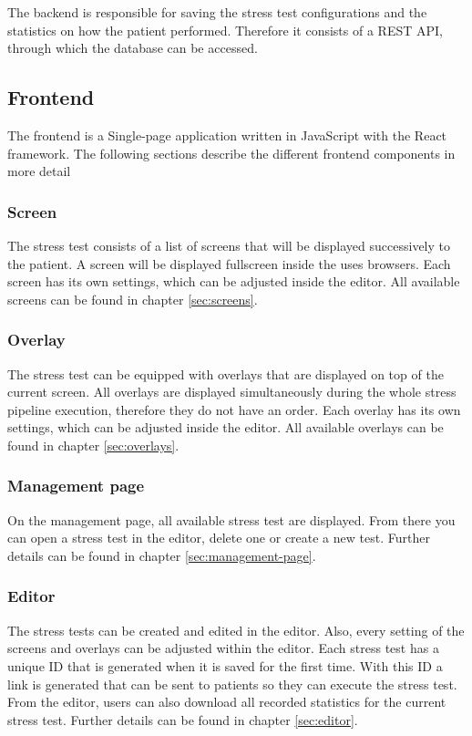 The backend is responsible for saving the stress test configurations and the statistics on how the patient performed.
Therefore it consists of a REST API, through which the database can be accessed.

\subsection{Frontend}
The frontend is a Single-page application written in JavaScript with the React framework. 
The following sections describe the different frontend components in more detail

\subsubsection*{Screen}
The stress test consists of a list of screens that will be displayed successively to the patient. 
A screen will be displayed fullscreen inside the uses browsers. 
Each screen has its own settings, which can be adjusted inside the editor. 
All available screens can be found in chapter \ref{sec:screens}.

\subsubsection*{Overlay}
The stress test can be equipped with overlays that are displayed on top of the current screen. 
All overlays are displayed simultaneously during the whole stress pipeline execution, therefore they do not have an order. 
Each overlay has its own settings, which can be adjusted inside the editor.
All available overlays can be found in chapter \ref{sec:overlays}.

\subsubsection*{Management page}
On the management page, all available stress test are displayed.
From there you can open a stress test in the editor, delete one or create a new test.
Further details can be found in chapter \ref{sec:management-page}.

\subsubsection*{Editor}
The stress tests can be created and edited in the editor.
Also, every setting of the screens and overlays can be adjusted within the editor.
Each stress test has a unique ID that is generated when it is saved for the first time.
With this ID a link is generated that can be sent to patients so they can execute the stress test.
From the editor, users can also download all recorded statistics for the current stress test.
Further details can be found in chapter \ref{sec:editor}.

